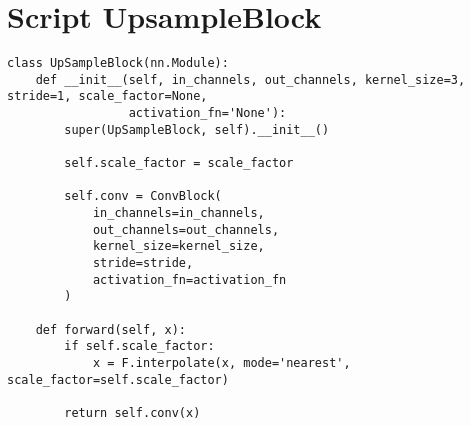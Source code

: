 \section{Script UpsampleBlock}
\label{sec:script_upsample_block}
\begin{listing}[H]
\begin{verbatim}
class UpSampleBlock(nn.Module):
    def __init__(self, in_channels, out_channels, kernel_size=3, stride=1, scale_factor=None,
                 activation_fn='None'):
        super(UpSampleBlock, self).__init__()

        self.scale_factor = scale_factor

        self.conv = ConvBlock(
            in_channels=in_channels,
            out_channels=out_channels,
            kernel_size=kernel_size,
            stride=stride,
            activation_fn=activation_fn
        )

    def forward(self, x):
        if self.scale_factor:
            x = F.interpolate(x, mode='nearest', scale_factor=self.scale_factor)

        return self.conv(x)
\end{verbatim}
\label{lst:script_upsample_block}
\end{listing}

